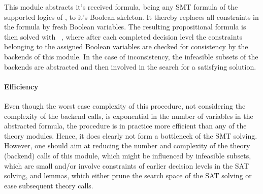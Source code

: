 This module abstracts it's received formula, being any SMT formula of the supported logics of \smtrat, to it's Boolean skeleton. It thereby replaces all constraints in the formula by fresh Boolean variables. The resulting propositional formula is then solved with \minisat~\cite{minisat}, where after each completed decision level the constraints belonging to the assigned Boolean variables are checked for consistency by the backends of this module. In the case of inconsistency, the infeasible subsets of the backends are abstracted and then involved in the search for a satisfying solution.

\paragraph{Efficiency} Even though the worst case complexity of this procedure, not considering the complexity of the backend calls, is exponential in the number of variables in the abstracted formula, the procedure is in practice more efficient than any of the theory modules. Hence, it does clearly not form a bottleneck of the SMT solving. However, one should aim at reducing the number and complexity of the theory (backend) calls of this module, which might be influenced by infeasible subsets, which are small and/or involve constraints of earlier decision levels in the SAT solving, and lemmas, which either prune the search space of the SAT solving or ease subsequent theory calls.